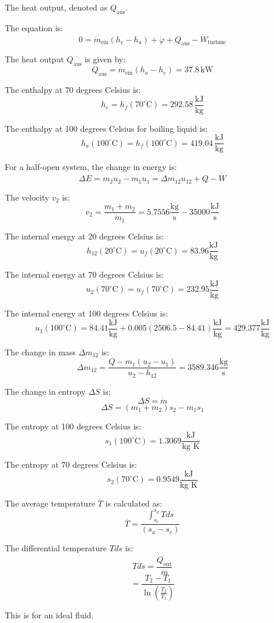 The heat output, denoted as \( Q_{\text{aus}} \).

The equation is:
\[ 0 = \dot{m}_{\text{ein}} (h_e - h_a) + \dot{\varphi} + Q_{\text{aus}} - \dot{W}_{\text{turbine}} \]

The heat output \( Q_{\text{aus}} \) is given by:
\[ Q_{\text{aus}} = \dot{m}_{\text{ein}} (h_a - h_e) = 37.8 \, \text{kW} \]

The enthalpy at 70 degrees Celsius is:
\[ h_e = h_f (70^\circ \text{C}) = 292.58 \, \frac{\text{kJ}}{\text{kg}} \]

The enthalpy at 100 degrees Celsius for boiling liquid is:
\[ h_{a} (100^\circ \text{C}) = h_f (100^\circ \text{C}) = 419.04 \, \frac{\text{kJ}}{\text{kg}} \]

For a half-open system, the change in energy is:
\[ \Delta E = m_2 u_2 - m_1 u_1 = \Delta m_{12} u_{12} + Q - \dot{W} \]

The velocity \( v_2 \) is:
\[ v_2 = \frac{m_1 + m_2}{\dot{m}_1} = 5.7556 \frac{\text{kg}}{\text{s}} - 35000 \frac{\text{kJ}}{\text{s}} \]

The internal energy at 20 degrees Celsius is:
\[ h_{12} (20^\circ \text{C}) = u_f (20^\circ \text{C}) = 83.96 \frac{\text{kJ}}{\text{kg}} \]

The internal energy at 70 degrees Celsius is:
\[ u_2 (70^\circ \text{C}) = u_f (70^\circ \text{C}) = 232.95 \frac{\text{kJ}}{\text{kg}} \]

The internal energy at 100 degrees Celsius is:
\[ u_1 (100^\circ \text{C}) = 84.41 \frac{\text{kJ}}{\text{kg}} + 0.005 (2506.5 - 84.41) \frac{\text{kJ}}{\text{kg}} = 429.377 \frac{\text{kJ}}{\text{kg}} \]

The change in mass \( \Delta m_{12} \) is:
\[ \Delta m_{12} = \frac{Q - m_1 (u_2 - u_1)}{u_2 - h_{12}} = 3589.346 \frac{\text{kg}}{\text{s}} \]

The change in entropy \( \Delta S \) is:
\[ \Delta S = \dot{m} \]
\[ \Delta S = (m_1 + m_2) s_2 - m_1 s_1 \]

The entropy at 100 degrees Celsius is:
\[ s_1 (100^\circ \text{C}) = 1.3069 \frac{\text{kJ}}{\text{kg K}} \]

The entropy at 70 degrees Celsius is:
\[ s_2 (70^\circ \text{C}) = 0.9549 \frac{\text{kJ}}{\text{kg K}} \]

The average temperature \( \overline{T} \) is calculated as:
\[ \overline{T} = \frac{\int_{s_e}^{s_a} T ds}{(s_a - s_e)} \]

The differential temperature \( T ds \) is:
\[ T ds = \frac{\dot{Q}_{\text{out}}}{\dot{m}} \]
\[ = \frac{T_2 - T_1}{\ln \left( \frac{T_2}{T_1} \right)} \]

This is for an ideal fluid.